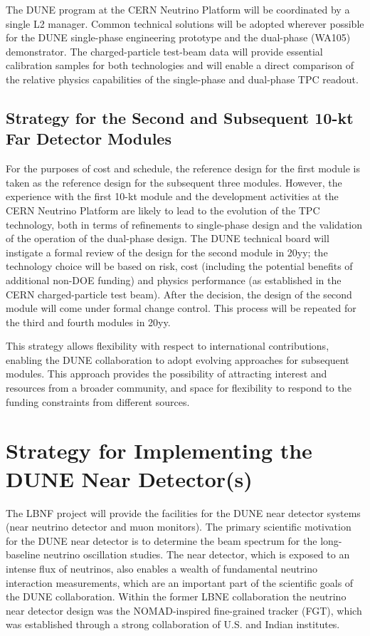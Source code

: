 The DUNE program at the CERN Neutrino Platform will be coordinated by a single 
L2 manager. Common technical solutions will be adopted wherever possible for the 
DUNE single-phase engineering prototype and the dual-phase (WA105) demonstrator. 
The charged-particle test-beam data will provide essential calibration samples 
for both technologies and will enable a direct comparison of the relative physics 
capabilities of the single-phase and dual-phase TPC readout. 

\subsection{Strategy for the Second and Subsequent 10-kt Far Detector Modules}
\label{v1ch3:subsqt-fd-mod-strategy}

For the purposes of cost and schedule, the reference design for the first module 
is taken as the reference design for the subsequent three modules. However, 
the experience with the first 10-kt module and the development activities at 
the CERN Neutrino Platform are likely to lead to the evolution of the TPC technology, both 
in terms of refinements to single-phase design and the validation of the operation 
of the dual-phase design. The DUNE technical board will instigate a formal review 
of the design for the second module in 20yy; %
the technology choice 
will be based on risk, cost (including the potential benefits of additional 
non-DOE funding) and physics performance (as established in the CERN charged-particle 
test beam). After the decision, the design of the second module will come under formal 
change control. This process will be repeated for the third and fourth modules 
in 20yy.%

This strategy allows flexibility with respect to international contributions, 
enabling the DUNE collaboration to
adopt evolving approaches for subsequent modules. This approach provides the possibility of attracting interest 
and resources from a broader community, and space for flexibility to respond to 
the funding constraints from different sources. 

\section{Strategy for Implementing the DUNE Near Detector(s)}
\label{v1ch:strategyND}

The LBNF project will provide the facilities for the DUNE near detector systems 
(near neutrino detector and muon monitors). The primary scientific motivation for 
the DUNE near detector %
is to determine the beam spectrum for the long-baseline 
neutrino oscillation studies. The near detector, which is exposed to an intense 
flux of neutrinos, also enables a wealth of fundamental neutrino 
interaction measurements, which are an important part of the  scientific 
goals of the DUNE collaboration. Within the former LBNE collaboration the neutrino 
near detector design was the NOMAD-inspired fine-grained tracker (FGT), which 
was established through a strong collaboration of U.S. and Indian institutes.

